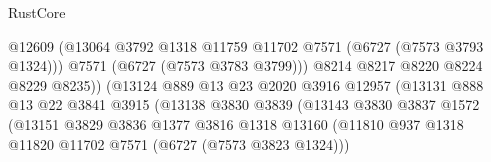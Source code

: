 \begin{lexlean}{RustCore}
\begin{coremodule}
                                            @12609
                                            (@13064
                                              @3792
                                              @1318
                                              @11759
                                              @11702
                                              @7571
                                              (@6727 (@7573 @3793 @1324)))
                                            @7571
                                            (@6727 (@7573 @3783 @3799)))
                                          @8214
                                          @8217
                                          @8220
                                          @8224
                                          @8229
                                          @8235))
                                      (@13124
                                        @889
                                        @13
                                        @23
                                        @2020
                                        @3916
                                        @12957
                                        (@13131
                                          @888
                                          @13
                                          @22
                                          @3841
                                          @3915
                                          (@13138
                                            @3830
                                            @3839
                                            (@13143
                                              @3830
                                              @3837
                                              @1572
                                              (@13151
                                                @3829
                                                @3836
                                                @1377
                                                @3816
                                                @1318
                                                @13160
                                                (@11810
                                                  @937
                                                  @1318
                                                  @11820
                                                  @11702
                                                  @7571
                                                  (@6727 (@7573 @3823 @1324)))

\end{coremodule}
\end{lexlean}
